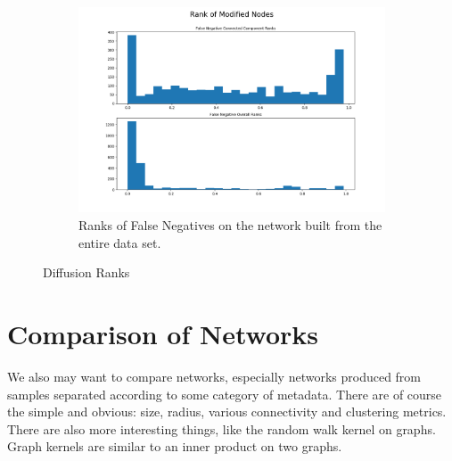 \documentclass[10pt]{article}
\theoremstyle{definition}
\numberwithin{theorem}{section}
\numberwithin{definition}{section}
\numberwithin{lemma}{section}
\numberwithin{corollary}{section}
\numberwithin{clm}{section}
\numberwithin{rmk}{section}
\begin{document}
\begin{figure}
	\begin{subfigure}{\textwidth}
\begin{center}
	\includegraphics[scale = 0.5]{../stat_figs/merged2/species_rks_fn_full.png}
	\caption{Ranks of False Negatives on the network built from the entire data set.}
\end{center}
	\end{subfigure}
\caption{Diffusion Ranks}
\end{figure}

\section{Comparison of Networks}
We also may want to compare networks, especially networks produced from samples separated according to some category of metadata. There are of course the simple and obvious: size, radius, various connectivity and clustering metrics. There are also more interesting things, like the random walk kernel on graphs. Graph kernels are similar to an inner product on two graphs.
\end{document}
